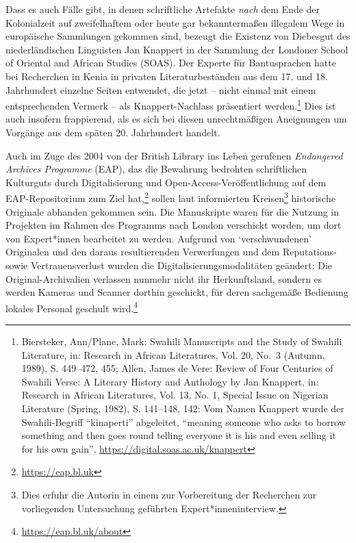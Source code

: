 \documentclass[a4paper,
fontsize=11pt,
oneside,
numbers=noperiodatend,
parskip=half-,
bibliography=totoc,
final
]{scrartcl}
\begin{document}
Dass es auch Fälle gibt, in denen schriftliche Artefakte \emph{nach} dem
Ende der Kolonialzeit auf zweifelhaftem oder heute gar bekanntermaßen
illegalem Wege in europäische Sammlungen gekommen sind, bezeugt die
Existenz von Diebesgut des niederländischen Linguisten Jan Knappert in
der Sammlung der Londoner School of Oriental and African Studies (SOAS).
Der Experte für Bantusprachen hatte bei Recherchen in Kenia in privaten
Literaturbeständen aus dem 17. und 18. Jahrhundert einzelne Seiten
entwendet, die jetzt -- nicht einmal mit einem entsprechenden Vermerk --
als Knappert-Nachlass präsentiert werden.\footnote{Biersteker,
  Ann/Plane, Mark: Swahili Manuscripts and the Study of Swahili
  Literature, in: Research in African Literatures, Vol. 20, No.~3
  (Autumn, 1989), S. 449--472, 455; Allen, James de Vere: Review of Four
  Centuries of Swahili Verse: A Literary History and Anthology by Jan
  Knappert, in: Research in African Literatures, Vol. 13, No. 1, Special
  Issue on Nigerian Literature (Spring, 1982), S. 141--148, 142: Vom
  Namen Knappert wurde der Swahili-Begriff \enquote{kinaperti}
  abgeleitet, \enquote{meaning someone who asks to borrow something and
  then goes round telling everyone it is his and even selling it for his
  own gain}, \url{https://digital.soas.ac.uk/knappert}} Dies ist auch
insofern frappierend, als es sich bei diesen unrechtmäßigen Aneignungen
um Vorgänge aus dem späten 20. Jahrhundert handelt.

Auch im Zuge des 2004 von der British Library ins Leben gerufenen
\emph{Endangered Archives Programme} (EAP), das die Bewahrung bedrohten
schriftlichen Kulturguts durch Digitalisierung und
Open-Access-Veröffentlichung auf dem EAP-Repositorium zum Ziel
hat,\footnote{\url{https://eap.bl.uk}} sollen laut informierten
Kreisen\footnote{Dies erfuhr die Autorin in einem zur Vorbereitung der
  Recherchen zur vorliegenden Untersuchung geführten
  Expert*inneninterview.} historische Originale abhanden gekommen sein.
Die Manuskripte waren für die Nutzung in Projekten im Rahmen des
Programms nach London verschickt worden, um dort von Expert*innen
bearbeitet zu werden. Aufgrund von \enquote*{verschwundenen} Originalen
und den daraus resultierenden Verwerfungen und dem Reputations- sowie
Vertrauensverlust wurden die Digitalisierungsmodalitäten geändert: Die
Original-Archivalien verlassen nunmehr nicht ihr Herkunftsland, sondern
es werden Kameras und Scanner dorthin geschickt, für deren sachgemäße
Bedienung lokales Personal geschult wird.\footnote{\url{https://eap.bl.uk/about}}
\end{document}
